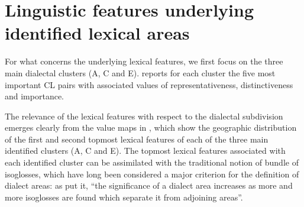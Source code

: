 \documentclass[output=paper]{LSP/langsci}
\begin{document}
\section{Linguistic features underlying identified lexical areas}

For what concerns the underlying lexical features, we first focus on the three main dialectal clusters (A, C and E).  reports for each cluster the five most important CL pairs with associated values of representativeness, distinctiveness and importance.

The relevance of the lexical features with respect to the dialectal subdivision emerges clearly from the value maps in , which show the geographic distribution of the first and second topmost lexical features of each of the three main identified clusters (A, C and E). The topmost lexical features associated with each identified cluster can be assimilated with the traditional notion of bundle of isoglosses, which have long been considered a major criterion for the definition of dialect areas: as \citet{chambers_dialectology_1998} put it, “the significance of a dialect area increases as more and more isoglosses are found which separate it from adjoining areas”.
\end{document}
